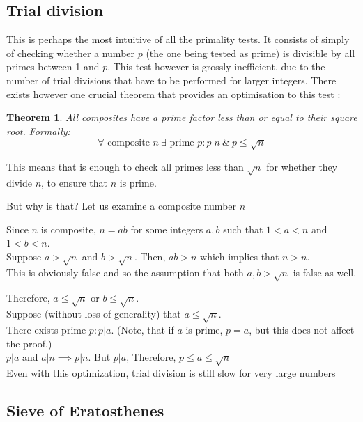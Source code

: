 \documentclass[12pt, titlepage]{article}
\newtheorem{theorem}{Theorem}
\begin{document}
    \subsection{Trial division}

    This is perhaps the most intuitive of all the primality tests. It consists of simply of
    checking whether a number $p$ (the one being tested as prime) is divisible by all primes
    between 1 and $p$. This test however is grossly inefficient, due to the number of trial
    divisions that have to be performed for larger integers. There exists however one
    crucial theorem that provides an optimisation to this test
    \autocite[276]{haese_ib_options}:
    \begin{theorem} \label{th:prime_factors_less_than_root}
        All composites have a prime factor less than or equal to their square
        root. Formally:\\
        $$\forall \text{ composite } n \: \exists \text{ prime } p:p|n \: \& \: p \leq \sqrt{n}$$
    \end{theorem}
    This means that is enough to check all primes less than $\sqrt{n}$ for whether they
    divide $n$, to ensure that $n$ is prime. 
    
    But why is that? Let us examine a composite number $n$

    Since $n$ is composite, $n=ab$ for some integers $a, b$ such that $1<a<n$ and $1<b<n$.\\
    Suppose $a>\sqrt{n}$ and $b>\sqrt{n}$. Then, $ab>n$ which implies that $n>n$. \\
    This is obviously false and so the assumption that both $a,b > \sqrt{n}$ is false as
    well.

    Therefore, $a \leq \sqrt{n}$ or $b \leq \sqrt{n}$. \\
    Suppose (without loss of generality) that $a \leq \sqrt{n}$.\\
    There exists prime $p: p|a$. (Note, that if $a$ is prime, $p = a$, but this does not
    affect the proof.)\\
    $p|a$ and $a|n \implies p|n$. But $p|a$, Therefore,  $p \leq a \leq \sqrt{n}$\\
    
    Even with this optimization, trial division is still slow for very large numbers 

    \subsection{Sieve of Eratosthenes}
\end{document}
